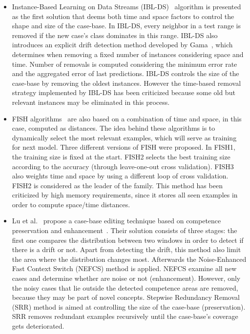 \documentclass[preprint,12pt]{elsarticle}
\begin{document}
\begin{itemize}
	\item Instance-Based Learning on Data Streams (IBL-DS)~\cite{berin07} algorithm is presented as the first solution that deems both time and space factors to control the shape and size of the case-base. In IBL-DS, every neighbor in a test range is removed if the new case's class dominates in this range. IBL-DS also introduces an explicit drift detection method developed by Gama~\cite{gama04}, which determines when removing a fixed number of instances considering space and time. Number of removals is computed considering the minimum error rate and the aggregated error of last predictions. IBL-DS controls the size of the case-base by removing the oldest instances. However the time-based removal strategy implemented by IBL-DS has been criticized because some old but relevant instances may be eliminated in this process.
	\item FISH algorithms~\cite{zlio11} are also based on a combination of time and space, in this case, computed as distances. The idea behind these algorithms is to dynamically select the most relevant examples, which will serve as training for next model. Three different versions of FISH were proposed. In FISH1, the training size is fixed at the start. FISH2 selects the best training size according to the accuracy (through leave-one-out cross validation). FISH3 also weights time and space by using a different loop of cross validation. FISH2 is considered as the leader of the family. This method has been criticized by high memory requirements, since it stores all seen examples in order to compute space/time distances.
	\item Lu et al.~\cite{lu16} propose a case-base editing technique based on competence preservation and enhancement~\cite{smyth95}. Their solution consists of three stages: the first one compares the distribution between two windows in order to detect if there is a drift or not. Apart from detecting the drift, this method also limit the area where the distribution changes most. Afterwards the Noise-Enhanced Fast Context Switch (NEFCS) method is applied. NEFCS examine all new cases and determine whether are noise or not (enhancement). However, only the noisy cases that lie outside the detected competence areas are removed, because they may be part of novel concepts. Stepwise Redundancy Removal (SRR) method is aimed at controlling the size of the case-base (preservation). SRR removes redundant examples recursively until the case-base's coverage gets deteriorated.

\end{itemize}
\end{document}
